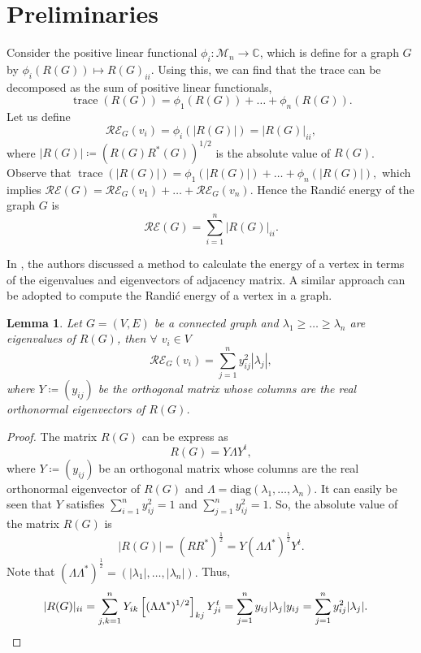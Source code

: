 \documentclass[10 pt]{article}
\newtheorem{lemma}{Lemma}[section]
\numberwithin{equation}{section}
\newcommand{\trace}{\operatorname{trace}}
\begin{document}
\section{Preliminaries}
Consider the positive linear functional $\phi_i:\mathcal{M}_n\rightarrow \mathbb{C}$, which is define for a graph $G$ by $\phi_i\left(R(G)\right)\mapsto R(G)_{ii}$. Using this, we can find that the trace can be decomposed as the sum of positive linear functionals,
$$\trace(R(G))=\phi_1(R(G))+\ldots+\phi_n(R(G)).$$
Let us define
$$\mathcal{RE}_G(v_i)=\phi_i(|R(G)|)=|R(G)|_{ii},$$
where $|R(G)|\coloneqq(R(G)R^*(G))^{1/2}$ is the absolute value of $R(G)$. Observe that $\trace(|R(G)|)=\phi_1(|R(G)|)+\ldots+\phi_n(|R(G)|),$ which implies $\mathcal{RE}(G)=\mathcal{RE}_G(v_1)+\ldots+\mathcal{RE}_G(v_n).$ Hence the Randi\'c energy of the graph $G$ is
$$\mathcal{RE}(G)=\sum\limits_{i=1}^n |R(G)|_{ii}.$$


In \cite{Arizmendi2018}, the authors discussed a method to calculate the energy of a vertex in terms of the eigenvalues and eigenvectors of adjacency matrix. A similar approach can be adopted to compute the Randi\'c energy of a vertex in a graph.

\begin{lemma}\label{Lemma definittion of vetrex energy}
Let $G=(V,E)$ be a connected graph and $\lambda_1\geq\ldots\geq\lambda_n$ are eigenvalues of $R(G)$, then $\forall$ $ v_i\in V$
$$\mathcal{RE}_G(v_i)=\sum\limits_{j=1}^ny^{2}_{ij}|\lambda_j|,$$
where $Y\coloneqq (y_{ij})$ be the orthogonal matrix whose columns are the real orthonormal eigenvectors of $R(G)$.
\end{lemma}
\begin{proof}
The matrix $R(G)$ can be express as $$R(G)=Y\Lambda Y^t,$$
where $Y\coloneqq (y_{ij})$ be an orthogonal matrix whose columns are the real orthonormal eigenvector of $R(G)$ and $\Lambda=\text{diag}\left(\lambda_1,\ldots,\lambda_n\right)$. It can easily be seen that $Y$ satisfies $\sum\limits_{i=1}^ny^2_{ij}=1$ and $\sum\limits_{j=1}^ny^2_{ij}=1$. So, the absolute value of the matrix $R(G)$ is
$$|R(G)|=(RR^*)^{\frac{1}{2}}=Y(\Lambda \Lambda^*)^{\frac{1}{2}}Y^t.$$
Note that $(\Lambda \Lambda^*)^{\frac{1}{2}}=\left(|\lambda_1|,\ldots,|\lambda_n|\right).$
Thus,
\begin{align*}
&|R(G)|_{ii}=\sum\limits_{j,k=1}^nY_{ik}\left[(\Lambda \Lambda^*)^{1/2}\right]_{kj}Y^t_{ji}=\sum\limits_{j=1}^ny_{ij}|\lambda_j|y_{ij}=\sum\limits_{j=1}^ny^{2}_{ij}|\lambda_j|.\qedhere
\end{align*}
\end{proof}
\end{document}
